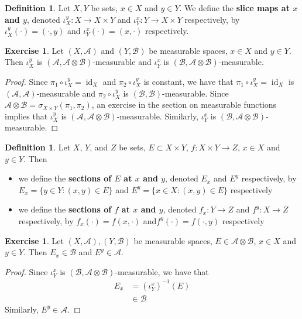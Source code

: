 \documentclass[12pt]{amsart}
\theoremstyle{definition}
\newtheorem{defn}[definition]{Definition}
\newtheorem{ex}[definition]{Exercise}
\newcommand{\sig}{\sigma}
\newcommand{\MA}{\mathcal{A}}
\newcommand{\MB}{\mathcal{B}}
\DeclareMathOperator{\id}{id}
\newcommand{\ld}[1]{\label{defn:#1}}
\begin{document}
	\begin{defn}
		Let $X, Y$ be sets, $x \in X$ and $y \in Y$. We define the \textbf{slice maps at $x$ and $y$}, denoted $\iota^y_X: X \rightarrow X \times Y$ and $\iota^x_Y: Y \rightarrow X \times Y$ respectively, by $\iota^y_X(\cdot) = (\cdot, y)$ and $\iota^x_Y(\cdot) = (x, \cdot)$ respectively. 
	\end{defn}
	
	\begin{ex}
		Let $(X, \MA )$ and $(Y, \MB)$ be measurable spaces, $x \in X$ and $y \in Y$. Then $\iota^y_X$ is $(\MA, \MA \otimes \MB)$-measurable and $\iota^x_Y$  is $(\MB, \MA \otimes \MB)$-measurable.
	\end{ex}
	
	\begin{proof}
		Since $\pi_1 \circ \iota^y_X = \id_{X}$ and $\pi_2 \circ \iota^y_X$ is constant, we have that $\pi_1 \circ \iota^y_X = \id_{X}$ is $(\MA, \MA)$-measurable and $\pi_2 \circ \iota^y_X$ is $(\MB, \MB)$-measurable. Since $\MA \otimes \MB = \sig_{X \times Y}(\pi_1, \pi_2)$, an exercise in the section on measurable functions implies that $\iota^y_X$ is $(\MA, \MA \otimes \MB)$-measurable. Similarly, $\iota^x_Y$ is $(\MB, \MA \otimes \MB)$-measurable.
	\end{proof}
	
	\begin{defn} \ld{00000} 
		Let $X$, $Y$, and $Z$ be sets, $E \subset X \times Y$, $f :X \times Y \rightarrow Z$, $x \in X$ and $y \in Y$. Then
		\begin{itemize}
			\item we define the \textbf{sections of $E$ at $x$ and $y$}, denoted $E_x$ and $E^y$ respectively, by $E_x = \{y \in Y: (x,y) \in E\}$ and $E^y = \{x \in X: (x,y) \in E\}$ respectively
			\item we define the \textbf{sections of $f$ at $x$ and $y$}, denoted $f_x:Y \rightarrow Z$ and $f^y:X \rightarrow Z$ respectively, by $f_x(\cdot) = f(x,\cdot)$ and$f^y(\cdot) = f(\cdot,y)$  respectively 
		\end{itemize}
	\end{defn}

	\begin{ex}
		Let $(X,\MA), (Y, \MB)$ be measurable spaces, $E \in \MA \otimes \MB$, $x \in X$ and $y \in Y$. Then $E_x \in \MB$ and $E^y \in \MA$.  
	\end{ex}
	
	\begin{proof}
		Since $\iota^x_Y$ is $(\MB, \MA \otimes \MB)$-measurable, we have that
		\begin{align*}
			E_x 
			& = (\iota^x_Y)^{-1}(E) \\
			& \in \MB 
		\end{align*}
		Similarly, $E^y \in \MA$. 
	\end{proof}
	
\end{document}
